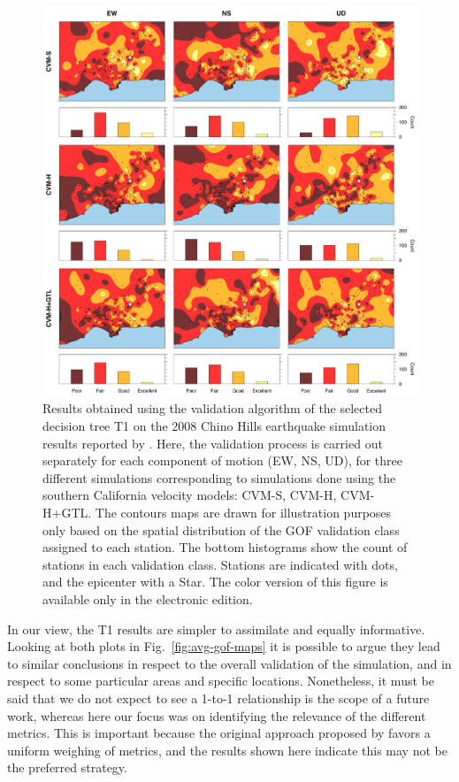 \begin{figure}%
	\centering
	\includegraphics[width=\textwidth]{figures/pdf/figure-10}
	\caption{Results obtained using the validation algorithm of the selected decision tree T1 on the 2008 Chino Hills earthquake simulation results reported by \citet{Taborda_2014_BSSA}. Here, the validation process is carried out separately for each component of motion (EW, NS, UD), for three different simulations corresponding to simulations done using the southern California velocity models: CVM-S, CVM-H, CVM-H+GTL. The contours maps are drawn for illustration purposes only based on the spatial distribution of the GOF validation class assigned to each station. The bottom histograms show the count of stations in each validation class. Stations are indicated with dots, and the epicenter with a Star. The color version of this figure is available only in the electronic edition.}
	\label{fig:res-gof-maps}
\end{figure}

In our view, the T1 results are simpler to assimilate and equally informative. Looking at both plots in Fig.~\ref{fig:avg-gof-maps} it is possible to argue they lead to similar conclusions in respect to the overall validation of the simulation, and in respect to some particular areas and specific locations. Nonetheless, it must be said that we do not expect to see a 1-to-1 relationship is the scope of a future work, whereas here our focus was on identifying the relevance of the different metrics. This is important because the original approach proposed by \citet{Anderson_2004_Proc} favors a uniform weighing of metrics, and the results shown here indicate this may not be the preferred strategy.

